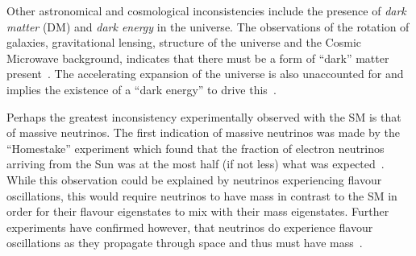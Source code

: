 Other astronomical and cosmological inconsistencies include the presence of \emph{dark matter} (DM) and \emph{dark energy} in the universe.
The observations of the rotation of galaxies, gravitational lensing, structure of the universe and the Cosmic Microwave background, indicates that there must be a form of ``dark'' matter present~\cite{Aghanim:2018eyx}.
The accelerating expansion of the universe is also unaccounted for and implies the existence of a ``dark energy'' to drive this~\cite{Peebles:2002gy,Aghanim:2018eyx}.

Perhaps the greatest inconsistency experimentally observed with the SM is that of massive neutrinos.
The first indication of massive neutrinos was made by the ``Homestake'' experiment which found that the fraction of electron neutrinos arriving from the Sun was at the most half (if not less) what was expected~\cite{PhysRevLett.20.1205}.
While this observation could be explained by neutrinos experiencing flavour oscillations, this would require neutrinos to have mass in contrast to the SM in order for their flavour eigenstates to mix with their mass eigenstates.
Further experiments have confirmed however, that neutrinos do experience flavour oscillations as they propagate through space and thus must have mass~\cite{Fukuda:1998mi,Ahmad:2001an,PhysRevD.88.032002}.
